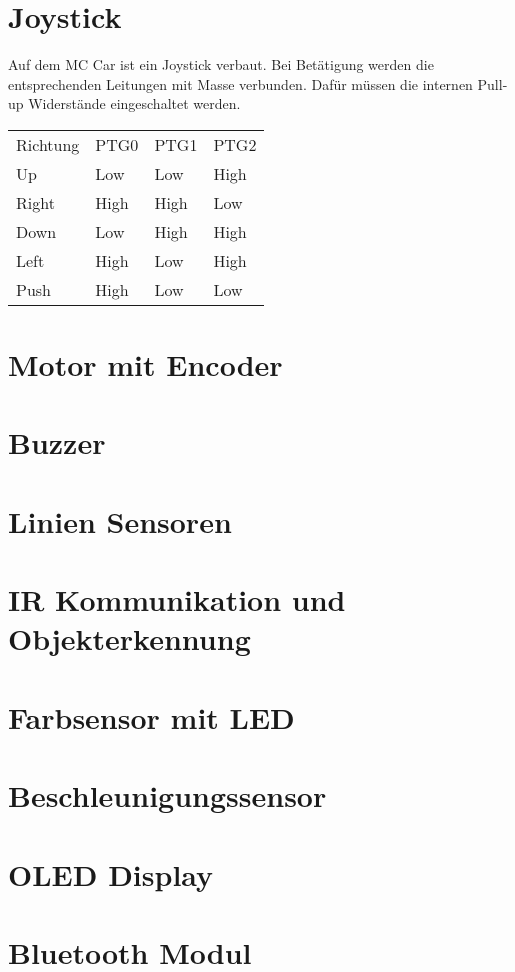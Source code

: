 \documentclass[a4paper,10pt,fleqn]{article}
\begin{document}
\section{Joystick}
Auf dem MC Car ist ein Joystick verbaut. Bei Betätigung werden die 
entsprechenden Leitungen mit Masse verbunden. Dafür müssen die internen 
Pull-up Widerstände eingeschaltet werden. 
\begin{table}[h!]
\begin{tabular}{llll}
\rowcolor{white} Richtung    & PTG0  & PTG1  & PTG2  \\
\rowcolor{lgray} Up          & Low   & Low   & High  \\
\rowcolor{white} Right       & High  & High  & Low   \\
\rowcolor{lgray} Down        & Low   & High  & High  \\
\rowcolor{white} Left        & High  & Low   & High  \\
\rowcolor{lgray} Push        & High  & Low   & Low   \\
\end{tabular}
\end{table}

\section{Motor mit Encoder}

\section{Buzzer}

\section{Linien Sensoren}

\section{IR Kommunikation und Objekterkennung}

\section{Farbsensor mit LED}

\section{Beschleunigungssensor}

\section{OLED Display}

\section{Bluetooth Modul}
\end{document}
